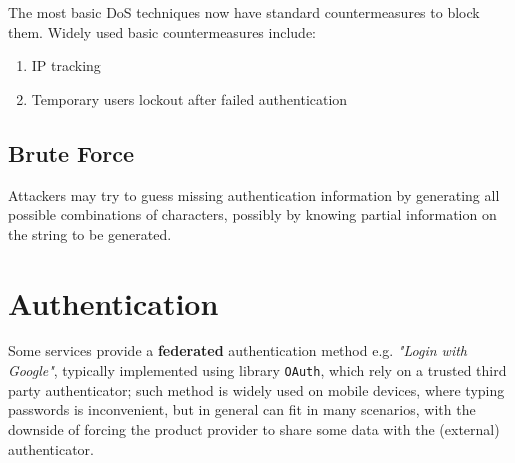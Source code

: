 The most basic DoS techniques now have standard countermeasures to block them.
Widely used basic countermeasures include:
\begin{enumerate}
   \item IP tracking
   \item Temporary users lockout after failed authentication
\end{enumerate}

\subsection{Brute Force}
Attackers may try to guess missing authentication information by generating all possible combinations of characters,
possibly by knowing partial information on the string to be generated.


\section{Authentication}
\label{sec:authentication}

Some services provide a \textbf{federated} authentication method e.g. \textit{"Login with Google"}, typically implemented using library \texttt{OAuth},
which rely on a trusted third party authenticator;
such method is widely used on mobile devices, where typing passwords is inconvenient,
but in general can fit in many scenarios,
with the downside of forcing the product provider to share some data with the (external) authenticator.

